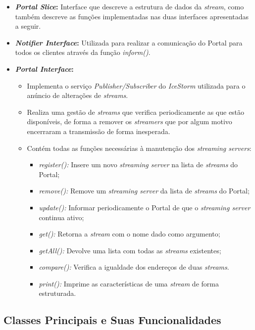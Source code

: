 \documentclass{article}
\begin{document}
\begin{itemize}
\item \textbf{\textit{Portal Slice}:} Interface que descreve a estrutura de dados da \textit{stream}, como também descreve as funções implementadas nas duas interfaces apresentadas a seguir.

\item \textbf{\textit{Notifier Interface}:} Utilizada para realizar a comunicação do Portal para todos os clientes através da função \textit{inform()}.

\item \textbf{\textit{Portal Interface}:}
	\begin{itemize}
	\item Implementa o serviço \textit{Publisher/Subscriber} do \textit{IceStorm} utilizada para o anúncio de alterações de \textit{streams}. 
	\item Realiza uma gestão de \textit{streams} que verifica periodicamente as que estão disponíveis, de forma a remover os \textit{streamers} que por algum motivo encerraram a transmissão de forma inesperada.
	\item Contém todas as funções necessárias à manutenção dos \textit{streaming servers}:
		\begin{itemize}
			\item \textit{register():} Insere um novo \textit{streaming server} na lista de \textit{streams} do Portal;
			\item \textit{remove():} Remove um \textit{streaming server} da lista de \textit{streams} do Portal;
			\item \textit{update():} Informar periodicamente o Portal de que o \textit{streaming server} continua ativo;
			\item \textit{get():} Retorna a \textit{stream} com o nome dado como argumento;
			\item \textit{getAll():} Devolve uma lista com todas as \textit{streams} existentes;
			\item \textit{compare():} Verifica a igualdade dos endereços de duas \textit{streams}.
			\item \textit{print():} Imprime as características de uma \textit{stream} de forma estruturada.
		\end{itemize}	
	\end{itemize}
\end{itemize}


\subsection{Classes Principais e Suas Funcionalidades}
\end{document}
